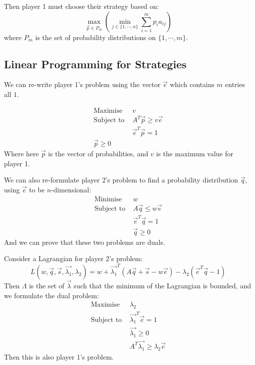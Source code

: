 \documentclass[../Main.tex]{subfiles}
\begin{document}
Then player 1 must choose their strategy based on:
\begin{equation*}
    \max_{\vec{p} \in P_m} \left(\min_{j \in \{1, \cdots, n\}} \sum_{i = 1}^m p_i a_{ij}\right)
\end{equation*}
where $P_m$ is the set of probability distributions on $\{1, \cdots, m\}$.
\subsection{Linear Programming for Strategies}
We can re-write player 1's problem using the vector $\vec{e}$ which contains $m$ entries all $1$.

\begin{align*}
    \text{Maximise } &v \\
    \text{Subject to } &A^T \vec{p} \geq v\vec{e} \\
    &\vec{e}^T \vec{p} = 1 \\
    \vec{p} \geq 0
\end{align*}
Where here $\vec{p}$ is the vector of probabilities, and $v$ is the maximum value for player 1.

We can also re-formulate player 2's problem to find a probability distribution $\vec{q}$, using $\vec{e}$ to be $n$-dimensional:
\begin{align*}
    \text{Minimise } &w \\
    \text{Subject to } &A\vec{q} \leq w\vec{e} \\
    &\vec{e}^T \vec{q} = 1 \\
    &\vec{q} \geq 0
\end{align*}
And we can prove that these two problems are duals.

Consider a Lagrangian for player 2's problem:
\begin{equation*}
    L(w, \vec{q}, \vec{s}, \vec{\lambda_1}, \lambda_2) = w + \vec{\lambda_1}^T \left(A\vec{q} + \vec{s} - w\vec{e}\right) - \lambda_2\left(\vec{e}^T\vec{q} - 1\right)
\end{equation*}
Then $\Lambda$ is the set of $\vec{\lambda}$ such that the minimum of the Lagrangian is bounded, and we formulate the dual problem:
\begin{align*}
    \text{Maximise } &\lambda_2 \\
    \text{Subject to } &\vec{\lambda_1}^T \vec{e} = 1 \\
    &\vec{\lambda_1} \geq 0 \\
    &A^T \vec{\lambda_1} \geq \lambda_2\vec{e}
\end{align*}
Then this is also player 1's problem.
\end{document}
